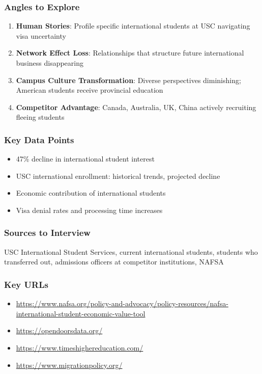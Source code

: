 \documentclass[11pt,letterpaper]{article}
\begin{document}
\subsubsection*{Angles to Explore}
\begin{enumerate}[noitemsep]
    \item \textbf{Human Stories}: Profile specific international students at USC navigating visa uncertainty
    \item \textbf{Network Effect Loss}: Relationships that structure future international business disappearing
    \item \textbf{Campus Culture Transformation}: Diverse perspectives diminishing; American students receive provincial education
    \item \textbf{Competitor Advantage}: Canada, Australia, UK, China actively recruiting fleeing students
\end{enumerate}

\subsubsection*{Key Data Points}
\begin{itemize}[noitemsep]
    \item 47\% decline in international student interest
    \item USC international enrollment: historical trends, projected decline
    \item Economic contribution of international students
    \item Visa denial rates and processing time increases
\end{itemize}

\subsubsection*{Sources to Interview}
USC International Student Services, current international students, students who transferred out, admissions officers at competitor institutions, NAFSA

\subsubsection*{Key URLs}
\begin{itemize}[noitemsep]
    \item \url{https://www.nafsa.org/policy-and-advocacy/policy-resources/nafsa-international-student-economic-value-tool}
    \item \url{https://opendoorsdata.org/}
    \item \url{https://www.timeshighereducation.com/}
    \item \url{https://www.migrationpolicy.org/}
\end{itemize}
\end{document}
